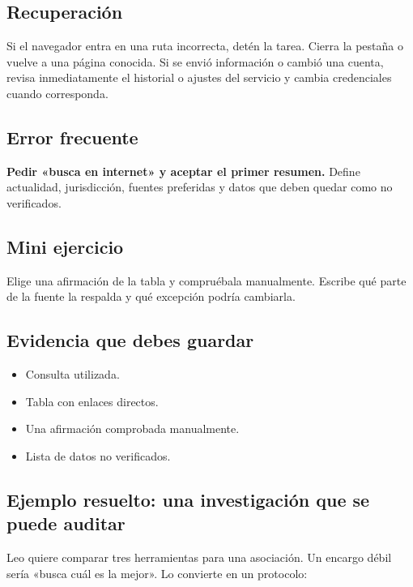 \documentclass[10pt,a4paper,openany]{book}
\providecommand{\tightlist}{\setlength{\itemsep}{0.18em}\setlength{\parskip}{0pt}}
\begin{document}
\subsection{Recuperación}\label{recuperaciuxf3n-6}

Si el navegador entra en una ruta incorrecta, detén la tarea. Cierra la
pestaña o vuelve a una página conocida. Si se envió información o cambió
una cuenta, revisa inmediatamente el historial o ajustes del servicio y
cambia credenciales cuando corresponda.

\subsection{Error frecuente}\label{error-frecuente-8}

\textbf{Pedir «busca en internet» y aceptar el primer resumen.} Define
actualidad, jurisdicción, fuentes preferidas y datos que deben quedar
como no verificados.

\subsection{Mini ejercicio}\label{mini-ejercicio-5}

Elige una afirmación de la tabla y compruébala manualmente. Escribe qué
parte de la fuente la respalda y qué excepción podría cambiarla.

\subsection{Evidencia que debes
guardar}\label{evidencia-que-debes-guardar-8}

\begin{itemize}
\tightlist
\item
  Consulta utilizada.
\item
  Tabla con enlaces directos.
\item
  Una afirmación comprobada manualmente.
\item
  Lista de datos no verificados.
\end{itemize}

\subsection{Ejemplo resuelto: una investigación que se puede
auditar}\label{ejemplo-resuelto-una-investigaciuxf3n-que-se-puede-auditar}

Leo quiere comparar tres herramientas para una asociación. Un encargo
débil sería «busca cuál es la mejor». Lo convierte en un protocolo:
\end{document}
